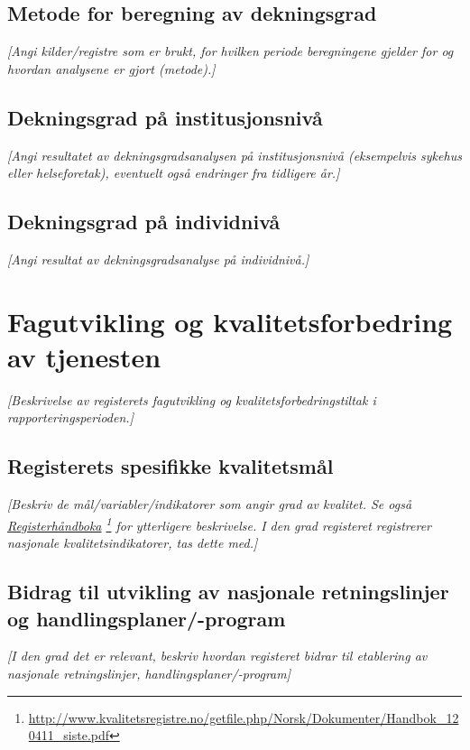 \documentclass[norsk, a4paper, twocolumn]{report}
\newcommand{\guide}[1] {
	\textit{[\textcolor{guidegray}{#1}]}
	}
\begin{document}
\section{Metode for beregning av dekningsgrad}\label{sec:met}
\guide{Angi kilder/registre som er brukt, for hvilken periode beregningene
gjelder for og hvordan analysene er gjort (metode).}

\section{Dekningsgrad på institusjonsnivå}\label{sec:endek}
\guide{Angi resultatet av dekningsgradsanalysen på institusjonsnivå
(eksempelvis sykehus eller helseforetak),
eventuelt også endringer fra tidligere år.}

\section{Dekningsgrad på individnivå}\label{sec:obs}
\guide{Angi resultat av dekningsgradsanalyse på individnivå.}




\chapter{Fagutvikling og kvalitetsforbedring av tjenesten}\label{cha:fag}
\guide{Beskrivelse av registerets fagutvikling og kvalitetsforbedringstiltak
i rapporteringsperioden.}

\section{Registerets spesifikke kvalitetsmål}\label{sec:regspe}
\guide{Beskriv de mål/variabler/indikatorer som angir grad av kvalitet.
Se også
\href{http://www.kvalitetsregistre.no/getfile.php/Norsk/Dokumenter/Handbok_120411_siste.pdf}{Registerhåndboka}
\footnote{\url{http://www.kvalitetsregistre.no/getfile.php/Norsk/Dokumenter/Handbok_120411_siste.pdf}}
for ytterligere beskrivelse. I den grad registeret registrerer nasjonale
kvalitetsindikatorer, tas dette med.}





\section{Bidrag til utvikling av nasjonale retningslinjer og handlingsplaner/-program}\label{sec:retut}
\guide{I den grad det er relevant, beskriv hvordan registeret bidrar til
etablering av nasjonale retningslinjer, handlingsplaner/-program}
\end{document}
